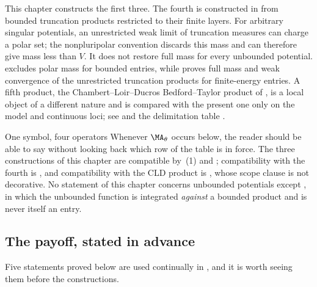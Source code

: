 This chapter constructs the first three.  The fourth is constructed in
 from bounded truncation products restricted to their
finite layers.  For arbitrary singular potentials, an unrestricted weak
limit of truncation measures can charge a polar set; the nonpluripolar
convention discards this mass and can therefore give mass less than $V$.
It does not restore full mass for every unbounded potential.
 excludes polar mass for bounded
entries, while  proves full mass and weak
convergence of the unrestricted truncation products for finite-energy
entries.  A fifth product, the
Chambert--Loir--Ducros Bedford--Taylor product of ,
is a local object of a different nature and is compared with the present one
only on the model and continuous loci; see
 and the delimitation table
.

\begin{warning}{One symbol, four operators}
\label{warn:ch24-four-operators}
Whenever $\MA_\theta$ occurs below, the reader should be able to say
without looking back which row of the table is in force.  The three
constructions of this chapter are compatible by
\,(1) and
; compatibility with the fourth is
, and compatibility with the CLD product is
, whose scope clause is not decorative.
No statement of this chapter concerns unbounded potentials except
, in which the unbounded function is
integrated \emph{against} a bounded product and is never itself an entry.
\end{warning}

\subsection{The payoff, stated in advance}
\label{sec:ch24-payoff}

Five statements proved below are used continually in
, and it is worth seeing them
before the constructions.

